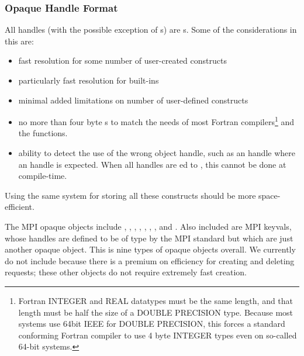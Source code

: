 \documentclass{article}
\begin{document}
\subsubsection{Opaque Handle Format}
All handles (with the possible exception of s) are
s.  Some of the considerations in this are:
\begin{itemize}
\item fast resolution for some number of user-created constructs
\item particularly fast resolution for built-ins
\item minimal added limitations on number of user-defined constructs 
\item no more than four byte s to match the needs of most
Fortran compilers\footnote{Fortran INTEGER and REAL datatypes must be
the same length, and that length must be half the size of a DOUBLE
PRECISION type.  Because most systems use 64bit IEEE for DOUBLE
PRECISION, this forces a standard conforming Fortran compiler to use 4
byte INTEGER types even on so-called 64-bit systems.} and the
 functions. 
\item ability to detect the use of the wrong object handle, such as an
 handle where an  handle is
expected.  When all handles are ed to , this
cannot be done at compile-time.
\end{itemize}

Using the same system for storing all these constructs should be more
space-efficient.

The MPI opaque objects include , ,
, , ,
, , and .  
Also included are MPI keyvals, whose handles are defined to be of type
 by the MPI standard but which are just another opaque
object.
This is nine types of opaque objects overall.
We
currently do not include  because there is a
premium on efficiency for creating and deleting requests; these other
objects do not require extremely fast creation.


\end{document}
